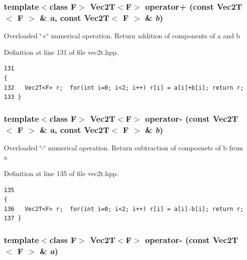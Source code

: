 \subsubsection{\setlength{\rightskip}{0pt plus 5cm}template$<$class F$>$ {\bf Vec2T}$<$F$>$ operator+ (const {\bf Vec2T}$<$ F $>$ \& {\em a}, const {\bf Vec2T}$<$ F $>$ \& {\em b})\hspace{0.3cm}{\tt  [inline]}}\label{vec2t_8hpp_61147d3998056a0c949aedc52392f8b2_61147d3998056a0c949aedc52392f8b2}


Overloaded \char`\"{}+\char`\"{} numerical operation. Return addition of components of a and b 

Definition at line 131 of file vec2t.hpp.

\footnotesize\begin{verbatim}131                                                                                     {
132   Vec2T<F> r;  for(int i=0; i<2; i++) r[i] = a[i]+b[i]; return r; 
133 }
\end{verbatim}\normalsize 


\subsubsection{\setlength{\rightskip}{0pt plus 5cm}template$<$class F$>$ {\bf Vec2T}$<$F$>$ operator- (const {\bf Vec2T}$<$ F $>$ \& {\em a}, const {\bf Vec2T}$<$ F $>$ \& {\em b})\hspace{0.3cm}{\tt  [inline]}}\label{vec2t_8hpp_bf9fcaff59650eff958ebe2ba1f84732_bf9fcaff59650eff958ebe2ba1f84732}


Overloaded \char`\"{}-\char`\"{} numerical operation. Return subtraction of compoenets of b from a 

Definition at line 135 of file vec2t.hpp.

\footnotesize\begin{verbatim}135                                                                                     {
136   Vec2T<F> r;  for(int i=0; i<2; i++) r[i] = a[i]-b[i]; return r;
137 }
\end{verbatim}\normalsize 


\subsubsection{\setlength{\rightskip}{0pt plus 5cm}template$<$class F$>$ {\bf Vec2T}$<$F$>$ operator- (const {\bf Vec2T}$<$ F $>$ \& {\em a})\hspace{0.3cm}{\tt  [inline]}}\label{vec2t_8hpp_f8399d53e2684a457a5004f956ca0ff6_f8399d53e2684a457a5004f956ca0ff6}


